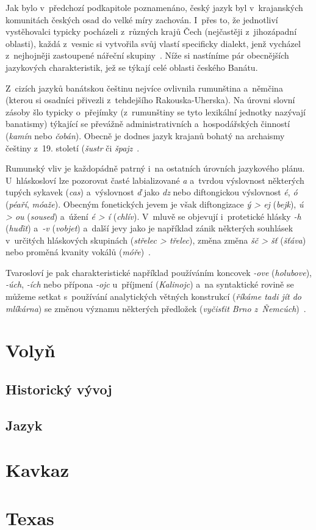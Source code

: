 Jak bylo v~předchozí podkapitole poznamenáno, český jazyk byl v~krajanských komunitách českých osad do velké míry zachován. I~přes to, že jednotliví vystěhovalci typicky pocházeli z~různých krajů Čech (nejčastěji z~jihozápadní oblasti), každá z~vesnic si vytvořila svůj vlastí specificky dialekt, jenž vycházel z~nejhojněji zastoupené nářeční skupiny~\parencite{Gecse2013}. Níže si nastíníme pár obecnějších jazykových charakteristik, jež se týkají celé oblasti českého Banátu.

Z~cizích jazyků banátskou češtinu nejvíce ovlivnila rumunština a~němčina (kterou si osadníci přivezli z~tehdejšího Rakouska-Uherska). Na úrovni slovní zásoby šlo typicky o~přejímky (z~rumunštiny se tyto lexikální jednotky nazývají banatismy) týkající se převážně administrativních a~hospodářských činností (\emph{kamín} nebo \emph{čobán}). Obecně je dodnes jazyk krajanů bohatý na archaismy češtiny z~19. století (\emph{šustr} či \emph{špajz}~\parencite{Frnochova2012}.

Rumunský vliv je každopádně patrný i~na ostatních úrovních jazykového plánu. U~hláskosloví lze pozorovat časté labializované \emph{a} a~tvrdou výslovnost některých tupých sykavek (\emph{cas}) a~výslovnost \emph{ď }jako \emph{dz} nebo diftongickou výslovnost \emph{é}, \emph{ó} (\emph{péaří}, \emph{móaže}). Obecným fonetických jevem je však diftongizace \emph{ý \textgreater{} ej} (\emph{bejk}), \emph{ú \textgreater{} ou} (\emph{soused}) a~úžení \emph{é \textgreater{} í} (\emph{chlív}). V~mluvě se objevují i~protetické hlásky \emph{-h} (\emph{huďit}) a~\emph{-v} (\emph{vobjet}) a~další jevy jako je například zánik některých souhlásek v~určitých hláskových skupinách (\emph{střelec \textgreater{} třelec}), změna změna \emph{šč \textgreater{} šť} (\emph{šťáva}) nebo proměná kvanity vokálů (\emph{móře})~\parencite{Skulina1976}.

Tvarosloví je pak charakteristické například používáním koncovek \emph{-ove} (\emph{holubove}), \emph{-úch}, \emph{-ích} nebo přípona \emph{-ojc} u~příjmení (\emph{Kalinojc}) a~na syntaktické rovině se můžeme setkat s~používání analytických větných konstrukcí (\emph{říkáme tadi jít do mlíkárna}) se změnou významu některých předložek (\emph{vyčisťit Brno z~Ňemcúch})~\parencite{Skulina1976}.

\hypertarget{volyux148}{%
\section{Volyň}\label{volyux148}}

\hypertarget{historickuxfd-vuxfdvoj-1}{%
\subsection*{Historický vývoj}\label{historickuxfd-vuxfdvoj-1}}

\hypertarget{jazyk-1}{%
\subsection*{Jazyk}\label{jazyk-1}}

\hypertarget{kavkaz}{%
\section{Kavkaz}\label{kavkaz}}

\hypertarget{texas}{%
\section{Texas}\label{texas}}
